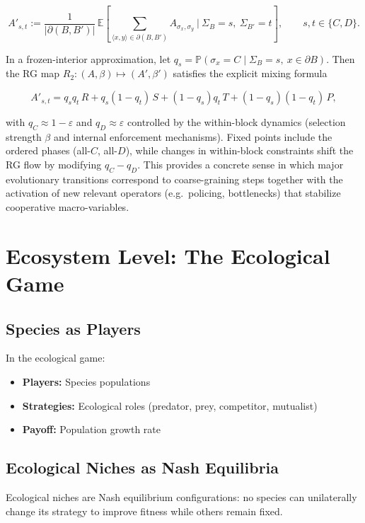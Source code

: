 \documentclass[12pt,a4paper]{article}
\theoremstyle{remark}
\begin{document}
\[
A'_{s,t}
:=\frac{1}{|\partial(B,B')|}\,
\mathbb E\!\left[\sum_{\langle x,y\rangle\in\partial(B,B')} A_{\sigma_x,\sigma_y}\ \Big|\ \Sigma_B=s,\ \Sigma_{B'}=t\right],
\qquad s,t\in\{C,D\}.
\]

In a frozen-interior approximation, let
$q_s=\mathbb P(\sigma_x=C\mid \Sigma_B=s,\ x\in\partial B)$.
Then the RG map $R_2:(A,\beta)\mapsto(A',\beta')$ satisfies the explicit mixing formula

\[
A'_{s,t}
= q_s q_t\,R + q_s(1-q_t)\,S + (1-q_s)q_t\,T + (1-q_s)(1-q_t)\,P,
\]

with $q_C\approx 1-\varepsilon$ and $q_D\approx \varepsilon$ controlled by the within-block dynamics (selection strength $\beta$ and internal enforcement mechanisms).
Fixed points include the ordered phases (all-$C$, all-$D$), while changes in within-block constraints shift the RG flow by modifying $q_C-q_D$.
This provides a concrete sense in which major evolutionary transitions correspond to coarse-graining steps together with the activation of new relevant operators (e.g.\ policing, bottlenecks) that stabilize cooperative macro-variables.

\section{Ecosystem Level: The Ecological Game}
\label{sec:ecosystem}

\subsection{Species as Players}

In the ecological game:
\begin{itemize}
    \item \textbf{Players:} Species populations
    \item \textbf{Strategies:} Ecological roles (predator, prey, competitor, mutualist)
    \item \textbf{Payoff:} Population growth rate
\end{itemize}

\subsection{Ecological Niches as Nash Equilibria}

Ecological niches are Nash equilibrium configurations: no species can unilaterally change its strategy to improve fitness while others remain fixed.
\end{document}
